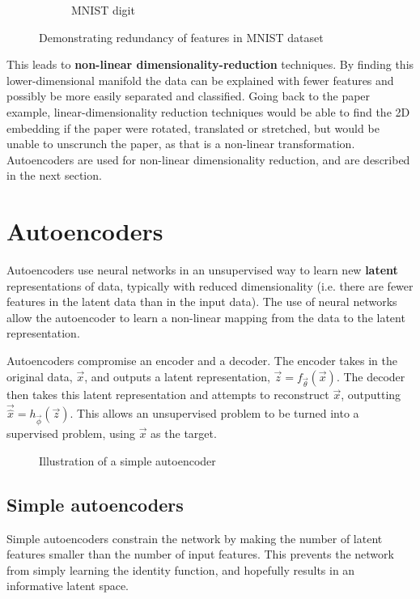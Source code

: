 \begin{figure}[H]
\begin{subfigure}[b]{0.4\linewidth}
    \caption{MNIST digit}
  \end{subfigure}
  \caption{Demonstrating redundancy of features in MNIST dataset}
  \label{fig:digit}
\end{figure}

This leads to \textbf{non-linear dimensionality-reduction} techniques. By finding this lower-dimensional
manifold the data can be explained with fewer features and possibly be more easily separated and classified. Going back to the paper example,
linear-dimensionality reduction techniques would be able to find the 2D embedding if the paper were 
rotated, translated or stretched, but would be unable to unscrunch the paper, as that is a non-linear transformation. Autoencoders are 
used for non-linear dimensionality reduction, and are described in the next section.

\section{Autoencoders}

Autoencoders use neural networks in an unsupervised way to learn new \textbf{latent} representations of data, typically with reduced 
dimensionality (i.e. there are fewer features in the latent data than in the input data). The use of neural networks allow the autoencoder 
to learn a non-linear mapping from the data to the latent representation.

Autoencoders compromise an encoder and a decoder. The encoder takes in the original data, $\vec{x}$, 
and outputs a latent representation, $\vec{z} = f_{\vec{\theta}}(\vec{x})$. The decoder then takes this latent representation and 
attempts to reconstruct $\vec{x}$, outputting $\vec{\hat{x}} = h_{\vec{\phi}}(\vec{z})$. This allows an unsupervised problem to be turned 
into a supervised problem, using $\vec{x}$ as the target.
\begin{figure}[H]
  \begin{center}
      \scalebox{.75}{}
      \caption{Illustration of a simple autoencoder}
      \label{fig:illustration_autoencoder}
  \end{center}
\end{figure}

\subsection{Simple autoencoders}

Simple autoencoders constrain the network by making the number of latent features smaller than the number of input
features. This prevents the network from simply learning the identity function, and hopefully results in an informative latent space.

